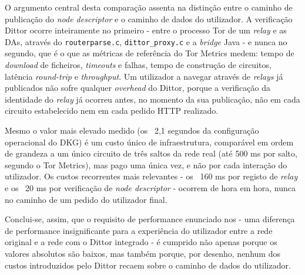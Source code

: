 O argumento central desta comparação assenta na distinção entre o caminho de publicação do \textit{node descriptor} e o caminho de dados do utilizador. A verificação Dittor ocorre inteiramente no primeiro - entre o processo Tor de um \textit{relay} e as DAs, através do \texttt{routerparse.c}, \texttt{dittor\_proxy.c} e a \textit{bridge} Java - e nunca no segundo, que é o que as métricas de referência do Tor Metrics medem: tempo de \textit{download} de ficheiros, \textit{timeouts} e falhas, tempo de construção de circuitos, latência \textit{round-trip} e \textit{throughput}. Um utilizador a navegar através de \textit{relays} já publicados não sofre qualquer \textit{overhead} do Dittor, porque a verificação da identidade do \textit{relay} já ocorreu antes, no momento da sua publicação, não em cada circuito estabelecido nem em cada pedido HTTP realizado.

Mesmo o valor mais elevado medido (os ~2,1 segundos da configuração operacional do DKG) é um custo único de infraestrutura, comparável em ordem de grandeza a um único circuito de três saltos da rede real (até 500 ms por salto, segundo o Tor Metrics), mas pago uma única vez, e não por cada interação do utilizador. Os custos recorrentes mais relevantes - os ~160 ms por registo de \textit{relay} e os ~20 ms por verificação de \textit{node descriptor} - ocorrem de hora em hora, nunca no caminho de um pedido do utilizador final.

Conclui-se, assim, que o requisito de performance enunciado nos  - uma diferença de performance insignificante para a experiência do utilizador entre a rede original e a rede com o Dittor integrado - é cumprido não apenas porque os valores absolutos são baixos, mas também porque, por desenho, nenhum dos custos introduzidos pelo Dittor recaem sobre o caminho de dados do utilizador.
